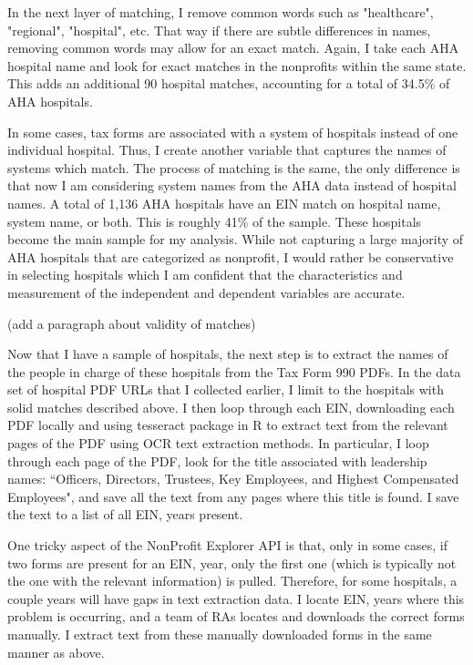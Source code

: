 \documentclass[12pt]{article}
\begin{document}
    In the next layer of matching, I remove common words such as "healthcare", "regional", "hospital", etc. That way if there are subtle differences in names, removing common words may allow for an exact match. Again, I take each AHA hospital name and look for exact matches in the nonprofits within the same state. This adds an additional 90 hospital matches, accounting for a total of 34.5\% of AHA hospitals. 

    In some cases, tax forms are associated with a system of hospitals instead of one individual hospital. Thus, I create another variable that captures the names of systems which match. The process of matching is the same, the only difference is that now I am considering system names from the AHA data instead of hospital names. A total of 1,136 AHA hospitals have an EIN match on hospital name, system name, or both. This is roughly 41\% of the sample. These hospitals become the main sample for my analysis. While not capturing a large majority of AHA hospitals that are categorized as nonprofit, I would rather be conservative in selecting hospitals which I am confident that the characteristics and measurement of the independent and dependent variables are accurate. 

    (add a paragraph about validity of matches)

    Now that I have a sample of hospitals, the next step is to extract the names of the people in charge of these hospitals from the Tax Form 990 PDFs. In the data set of hospital PDF URLs that I collected earlier, I limit to the hospitals with solid matches described above. I then loop through each EIN, downloading each PDF locally and using tesseract package in R to extract text from the relevant pages of the PDF using OCR text extraction methods. In particular, I loop through each page of the PDF, look for the title associated with leadership names: ``Officers, Directors, Trustees, Key Employees, and Highest Compensated Employees", and save all the text from any pages where this title is found. I save the text to a list of all EIN, years present. 

    One tricky aspect of the NonProfit Explorer API is that, only in some cases, if two forms are present for an EIN, year, only the first one (which is typically not the one with the relevant information) is pulled. Therefore, for some hospitals, a couple years will have gaps in text extraction data. I locate EIN, years where this problem is occurring, and a team of RAs locates and downloads the correct forms manually. I extract text from these manually downloaded forms in the same manner as above. 
\end{document}
